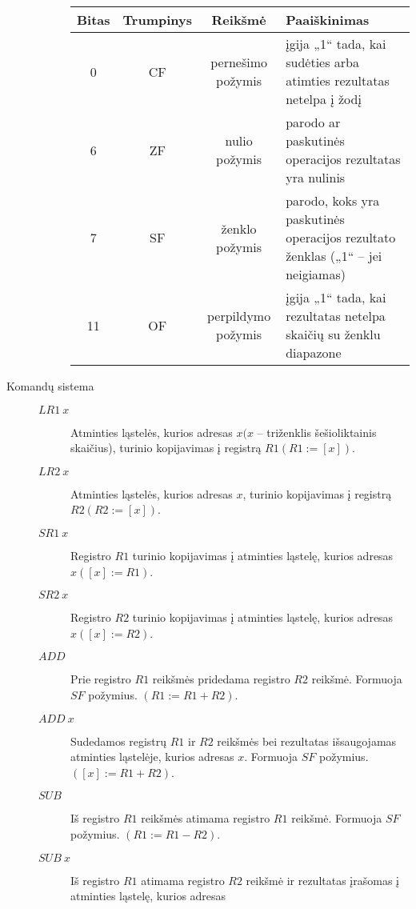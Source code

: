\begin{description}
\begin{description}
        \begin{tabularx}{0.85\textwidth}{|c|c|c|X|} 
          \hline
          Bitas & Trumpinys & Reikšmė & Paaiškinimas \\
          \hline
          0 & CF & pernešimo požymis & įgija „1“ tada, kai sudėties arba
          atimties rezultatas netelpa į žodį \\
          \hline
          6 & ZF & nulio požymis & parodo ar paskutinės operacijos 
          rezultatas yra nulinis \\
          \hline
          7 & SF & ženklo požymis & parodo, koks yra paskutinės operacijos 
          rezultato ženklas („1“ – jei neigiamas) \\
          \hline
          11 & OF & perpildymo požymis & įgija „1“ tada, kai rezultatas
          netelpa skaičių su ženklu diapazone \\
          \hline
        \end{tabularx}
    \end{description}
  \item[Komandų sistema] \hfill
    \begin{description} 
        \item[$LR1 \: x$] Atminties ląstelės, kurios adresas 
          $x (x $ – triženklis šešioliktainis skaičius), 
          turinio kopijavimas į registrą $R1 (R1:=[x])$.
        \item[$LR2 \: x$] Atminties ląstelės, kurios adresas 
          $x$, turinio kopijavimas į registrą $R2 (R2:=[x])$.
        \item[$SR1 \: x$] Registro $R1$ turinio kopijavimas į atminties 
          ląstelę, kurios adresas $x ([x]:=R1)$.
        \item[$SR2 \: x$] Registro $R2$ turinio kopijavimas į atminties 
          ląstelę, kurios adresas $x ([x]:=R2)$.
        \item[$ADD$] Prie registro $R1$ reikšmės pridedama registro $R2$ 
          reikšmė. Formuoja $SF$ požymius. $(R1:=R1+R2)$.
        \item[$ADD \: x$] Sudedamos registrų $R1$ ir $R2$ reikšmės bei 
          rezultatas išsaugojamas atminties ląstelėje, kurios adresas 
          $x$. Formuoja $SF$ požymius. $([x]:=R1+R2)$.
        \item[$SUB$] Iš registro $R1$ reikšmės atimama registro $R1$ 
          reikšmė. Formuoja $SF$ požymius. $(R1:=R1-R2)$.
        \item[$SUB \: x$] Iš registro $R1$ atimama registro $R2$ reikšmė ir 
          rezultatas įrašomas į atminties ląstelę, kurios adresas 

\end{description}
\end{description}
